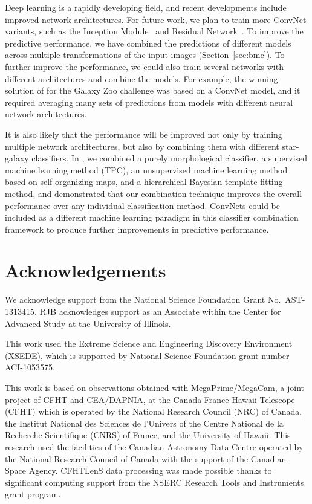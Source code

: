 \documentclass[fleqn,usenatbib]{mnras}
\begin{document}
Deep learning is a rapidly developing field, and recent developments include
improved network architectures.
For future work, we plan to train more ConvNet variants, such as the
Inception Module~\citep{szegedy2015going} and Residual Network~\citep{he2015deep}.
To improve the predictive performance,
we have combined the predictions of different models across multiple
transformations of the input images (Section~\ref{sec:bmc}).
To further improve the performance, we could also train several networks
with different architectures and combine the models.
For example, the winning solution of \cite{dieleman2015rotation}
for the Galaxy Zoo challenge was based on a ConvNet model,
and it required averaging many sets of predictions from models with different
neural network architectures.

It is also likely that the performance will be improved
not only by training multiple network architectures,
but also by combining them with different star-galaxy classifiers.
In \citet{kim2015hybrid}, we combined a purely morphological classifier,
a supervised machine learning method (TPC),
an unsupervised machine learning method based on self-organizing maps,
and a hierarchical Bayesian template fitting method, and
demonstrated that our combination technique improves the overall
performance over any individual classification method.
ConvNets could be included as a different machine learning paradigm in this
classifier combination framework to produce further improvements in
predictive performance.



\section*{Acknowledgements}

We acknowledge support from the 
National Science Foundation Grant No.\ AST-1313415.
RJB acknowledges support as an Associate
within the Center for Advanced Study at the University of Illinois.


This work used the Extreme Science and Engineering Discovery Environment
(XSEDE), which is supported by National Science Foundation grant number
ACI-1053575.

This work is based on observations obtained with MegaPrime/MegaCam, a
joint project of CFHT and CEA/DAPNIA, at the Canada-France-Hawaii
Telescope (CFHT) which is operated by the National Research Council
(NRC) of Canada, the Institut National des Sciences de l'Univers of
the Centre National de la Recherche Scientifique (CNRS) of France, and
the University of Hawaii. This research used the facilities of the
Canadian Astronomy Data Centre operated by the National Research
Council of Canada with the support of the Canadian Space Agency.
CFHTLenS data processing was made possible thanks to significant
computing support from the NSERC Research Tools and Instruments grant
program.
\end{document}
